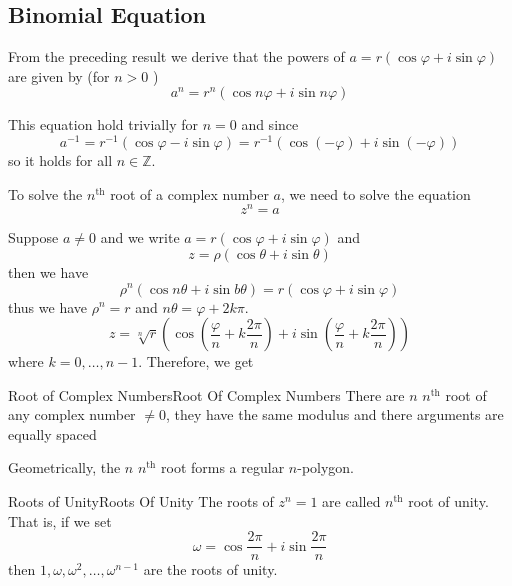 \documentclass[../main.tex]{subfiles}
\begin{document}
\subsection{Binomial Equation}

From the preceding result we derive that the powers of $a = r(\cos \varphi+i \sin \varphi)$ are given by (for $n>0$ )
\begin{equation}
a^n = r^n (\cos n \varphi + i \sin n \varphi)
\end{equation}

This equation hold trivially for $n=0$ and since 
\begin{equation*}
a^{-1} = r^{-1}(\cos \varphi-i \sin \varphi) = r^{-1}(\cos (-\varphi)+ i \sin (-\varphi))
\end{equation*}
so it holds for all $n\in \mathbb{Z}$.

To solve the $n^\text{th}$ root of a complex number $a$, we need to solve the equation
\begin{equation*}
z^n=a
\end{equation*}

Suppose $a\neq 0$ and we write $a = r(\cos \varphi + i \sin \varphi)$ and 
\begin{equation*}
z = \rho(\cos \theta + i \sin \theta)
\end{equation*}
then we have
\begin{equation*}
\rho^n(\cos n \theta + i \sin b \theta) = r(\cos \varphi+i \sin \varphi)
\end{equation*}
thus we have $\rho^n = r$ and $n \theta = \varphi + 2k \pi$.
\begin{equation*}
	z = \sqrt[n]{r} \left(\cos \left(\frac{\varphi}{n}+k \frac{2\pi}{n}\right) + i \sin \left(\frac{\varphi}{n} + k \frac{2\pi}{n}\right)\right)
\end{equation*}
where $k = 0, \ldots ,n-1$. Therefore, we get
\begin{theorem}{Root of Complex Numbers}{Root Of Complex Numbers}
There are $n$ $n^\text{th}$ root of any complex number $\neq 0$, they have the same modulus and there arguments are equally spaced
\end{theorem}

Geometrically, the $n$ $n^\text{th}$ root forms a regular $n$-polygon.
\begin{definition}{Roots of Unity}{Roots Of Unity}
The roots of $z^n=1$ are called $n^\text{th}$ root of unity. That is, if we set
\begin{equation}
\omega = \cos \frac{2\pi}{n} + i \sin \frac{2\pi}{n}
\end{equation}
then $1, \omega, \omega^2, \ldots ,\omega^{n-1}$ are the roots of unity.
\end{definition}
\end{document}
